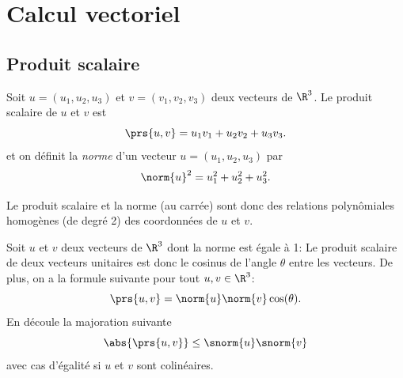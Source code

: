 \sld{\vfill\pagebreak[5]}%




\section{Calcul vectoriel}

\subsection{Produit scalaire}

\begin{definition}
	Soit $u =(u_1,u_2,u_3)$ et $v=(v_1,v_2,v_3)$ deux vecteurs de $\R^3$. Le produit scalaire de $u$ et $v$ est
	\[
		\prs{u,v} = u_1v_1 + u_2v_2 + u_3v_3.
	\]
et on définit la \emph{norme} d'un vecteur $u=(u_1,u_2,u_3)$ par
\[
	\norm{u}^2  = {u_1^2+u_2^2+u_3^2}.
\]
\end{definition}
\begin{remark}
    Le produit scalaire et la norme (au carrée) sont donc des relations polynômiales homogènes (de degré 2) des coordonnées de $u$ et $v$.
\end{remark}

\sld{\vfill\pagebreak[5]}%

 Soit $u$ et $v$ deux vecteurs  de $\R^3$ dont la norme est égale à 1:
 \pl{\rep{4cm}}
Le produit scalaire de deux vecteurs unitaires est donc le cosinus de l'angle $\theta$ entre les vecteurs.
De plus, on a la formule suivante pour tout $u,v\in\R^3$:
\[
	\prs{u,v} = \norm{u}\norm{v} \cos(\theta).
\]
En découle la majoration suivante \[\abs{\prs{u,v}} \leq \snorm{u}\snorm{v}\] avec cas d'égalité si $u$ et $v$ sont colinéaires.

